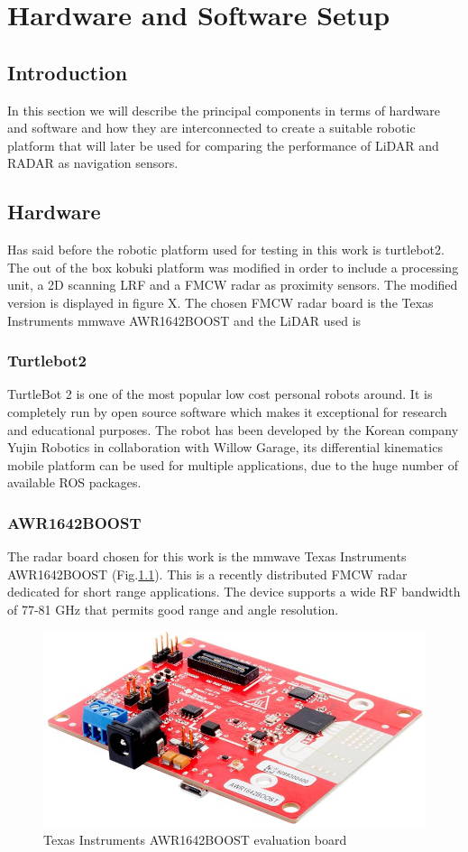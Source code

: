 \chapter{Hardware and Software Setup}

\section{Introduction}
In this section we will describe the principal components in terms of hardware and software and how they are interconnected to create a suitable robotic platform that will later be used for comparing the performance of \ac{LiDAR} and \ac{RADAR} as navigation sensors.  
\section{Hardware}
Has said before the robotic platform used for testing in this work is turtlebot2. The out of the box kobuki platform was modified in order to include a processing unit, a 2D scanning \ac{LRF} and a \ac{FMCW} radar as proximity sensors. The modified version is displayed in figure X.  The chosen \ac{FMCW} radar board is the Texas Instruments mmwave AWR1642BOOST and the \ac{LiDAR} used is 
\subsection{Turtlebot2}
TurtleBot 2 \fig{} is one of the  most popular low cost personal robots around. It is completely run by open source software which makes it exceptional for research and educational purposes. The robot has been developed by the Korean company Yujin Robotics in collaboration with Willow Garage, its differential kinematics mobile platform can be used for multiple applications, due to the huge number of available ROS packages.

\subsection{AWR1642BOOST}

The radar board chosen for this work is the mmwave Texas Instruments AWR1642BOOST (Fig.\ref{fig:awr}). This is a recently distributed \ac{FMCW} radar dedicated for short range applications. The device supports a wide RF bandwidth of 77-81 GHz that permits good range and angle resolution.

\begin{figure}[h] 
\centerline{\includegraphics [width=0.5 \textwidth]{imgs/chapter4/awr1642.jpg}}
\caption{Texas Instruments AWR1642BOOST evaluation board}
\label{fig:awr}
\end{figure}

